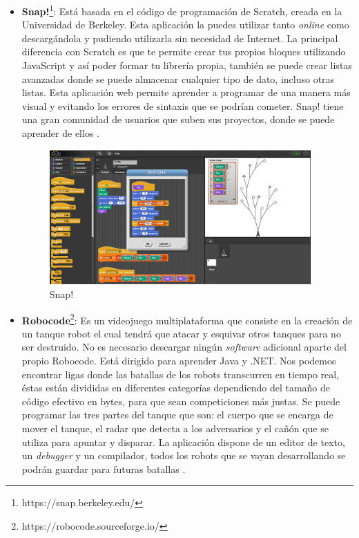 \begin{itemize}
\item \textbf{Snap!}\footnote{https://snap.berkeley.edu/}: Está basada en el código de programación de Scratch, creada en la Universidad de Berkeley. Esta aplicación la puedes utilizar tanto \textit{online} como descargándola y pudiendo utilizarla sin necesidad de Internet. La principal diferencia con Scratch es que te permite crear tus propios bloques utilizando JavaScript y así poder formar tu librería propia, también se puede crear listas avanzadas donde se puede almacenar cualquier tipo de dato, incluso otras listas.  Esta aplicación web permite aprender a programar de una manera más visual y evitando los errores de sintaxis que se podrían cometer. Snap! tiene una gran comunidad de usuarios que suben sus proyectos, donde se puede aprender de ellos \cite{app}.


\begin{figure}[H]
    \centering
    \includegraphics[width=10cm, keepaspectratio]{img/snap.png}
    \caption{Snap!}
    \label{fig:snap}
\end{figure}

\item\textbf{Robocode}\footnote{https://robocode.sourceforge.io/}: Es un videojuego multiplataforma que consiste en la creación de un tanque robot el cual tendrá que atacar y esquivar otros tanques para no ser destruido. No es necesario descargar ningún \textit{software} adicional aparte del propio Robocode. Está dirigido para aprender Java y .NET. Nos podemos encontrar ligas donde las batallas de los robots transcurren en tiempo real, éstas están divididas en diferentes categorías dependiendo del tamaño de código efectivo en bytes, para que sean competiciones más justas. Se puede programar las tres partes del tanque que son: el cuerpo que se encarga de mover el tanque, el radar que detecta a los adversarios y el cañón que se utiliza para apuntar y disparar. La aplicación dispone de un editor de texto, un \textit{debugger} y un compilador, todos los robots que se vayan desarrollando se podrán guardar para futuras batallas \cite{app}.



\end{itemize}
